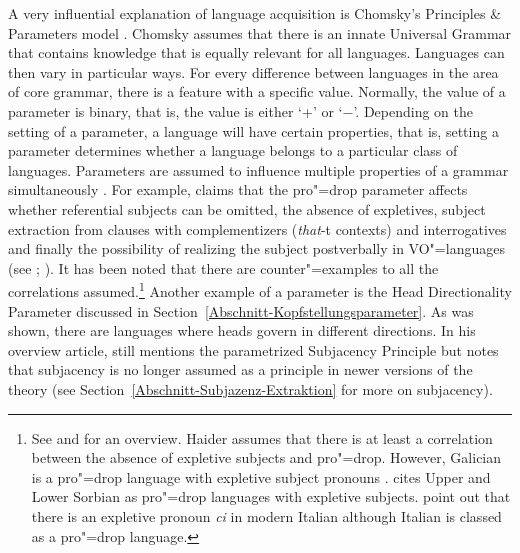 A very influential explanation of language acquisition is Chomsky's Principles \& Parameters model
\citeyearpar{Chomsky81a}. Chomsky assumes that there is an innate Universal Grammar that contains knowledge that is equally relevant for all languages.
Languages can then vary in particular ways. For every difference between languages in the area of core grammar, there is a feature with a specific
value. Normally, the value of a parameter is binary, that is, the value is either `+' or `$-$'.
Depending on the setting of a parameter, a language will have certain properties, that is, setting a parameter determines whether
a language belongs to a particular class of languages.
Parameters are assumed to influence multiple properties of a grammar simultaneously \citep[]{Chomsky81a}. For example, \citet{Rizzi86a} claims
that the pro"=drop parameter affects whether referential subjects can be omitted, the absence of expletives, subject
extraction from clauses with complementizers (\emph{that}-t contexts) and interrogatives and
finally the possibility of realizing the subject postverbally in VO"=languages (see
\citealp[Section~4.3]{Chomsky81a}; \citealp[]{Meisel95a}). It has been noted that there are counter"=examples to all the correlations assumed.\footnote{%
\label{fn-Expletiva-Pro-Drop}%
  See  and  for an overview. Haider assumes that there is at least a correlation
  between the absence of expletive subjects and pro"=drop. However, Galician is a pro"=drop language with expletive subject
  pronouns \citep[Section~2.5]{RU90a-u}. \citet[]{Franks95a-u} cites Upper and Lower Sorbian as pro"=drop
  languages with expletive subjects. \citet[]{SP2002b} point out that there is an expletive pronoun \emph{ci} in modern Italian
  although Italian is classed as a pro"=drop language.}
Another example of a parameter is the Head Directionality Parameter discussed in Section~\ref{Abschnitt-Kopfstellungsparameter}.
As was shown, there are languages where heads govern in different directions. In his overview article, \citet{Haider2001a} still mentions
the parametrized Subjacency Principle but notes that subjacency is no longer assumed as a principle
in newer versions of the theory (see Section~\ref{Abschnitt-Subjazenz-Extraktion} for more on subjacency).

